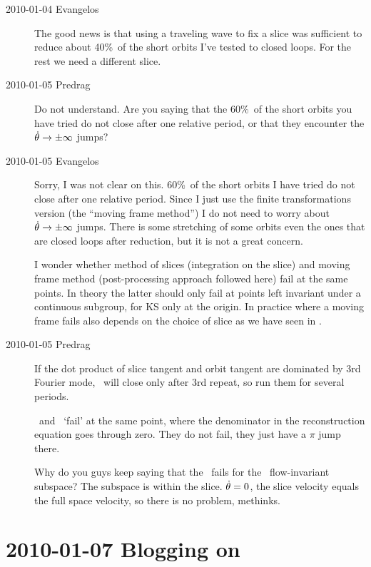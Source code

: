 \begin{description}
\item[2010-01-04 Evangelos]
The good news is that using a traveling wave to
fix a slice was sufficient to reduce about 40\%\ of the short orbits I've
tested to closed loops. For the rest we need a different slice.

\item[2010-01-05 Predrag] Do not understand. Are you saying that the
60\%\ of the short orbits you have tried do not close after one relative period,
or that they encounter the $ \dot{\theta} \to \pm\infty$ jumps?

\item[2010-01-05 Evangelos] Sorry, I was not clear on this. 60\%\ of the short orbits
I have tried do not close after one relative period. Since I just use the finite
transformations version (the ``moving frame method'') I do not need to worry about
$ \dot{\theta} \to \pm\infty$ jumps. There is some stretching of some orbits even the
ones that are closed loops after reduction, but it is not a great concern.

I wonder whether method of slices (integration on the slice) and moving
frame method (post-processing approach followed here) fail at the same
points. In theory the latter should only fail at points left invariant
under a continuous subgroup, for KS only at the origin. In practice where
a moving frame fails also depends on the choice of slice as we have seen
in \cLe.

\item[2010-01-05 Predrag] If the dot product of slice tangent
and orbit tangent are dominated by 3rd Fourier mode, \rpo\
will close only after 3rd repeat, so run them for several
periods.

\Mslices\ and \mframes\ `fail' at the same point, where the
denominator in the reconstruction equation goes through zero.
They do not fail, they just have a $\pi$ jump there.

Why do you guys keep saying that the \mslices\ fails for the
\Fix{\Group}\ flow-invariant subspace? The subspace is within
the slice. $\dot{\theta}=0$, the slice velocity equals the
full space velocity, so there is no problem, methinks.

\end{description}

\section{2010-01-07 Blogging on}


